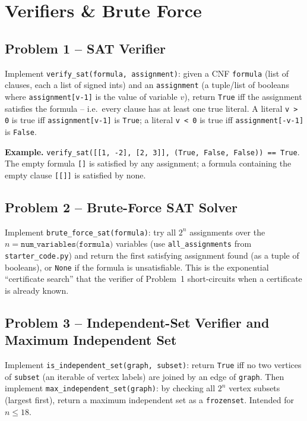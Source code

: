 \documentclass[11pt]{article}
\begin{document}
\newpage
\section{Verifiers \& Brute Force}

\subsection*{Problem 1 -- SAT Verifier}

Implement \texttt{verify\_sat(formula, assignment)}: given a CNF \texttt{formula} (list of
clauses, each a list of signed ints) and an \texttt{assignment} (a tuple/list of booleans
where \texttt{assignment[v-1]} is the value of variable $v$), return \texttt{True} iff the
assignment satisfies the formula -- i.e.\ every clause has at least one true literal. A
literal \texttt{v > 0} is true iff \texttt{assignment[v-1]} is \texttt{True}; a literal
\texttt{v < 0} is true iff \texttt{assignment[-v-1]} is \texttt{False}.

\textbf{Example.} \texttt{verify\_sat([[1, -2], [2, 3]], (True, False, False)) == True}.
The empty formula \texttt{[]} is satisfied by any assignment; a formula containing the
empty clause \texttt{[[]]} is satisfied by none.

\subsection*{Problem 2 -- Brute-Force SAT Solver}

Implement \texttt{brute\_force\_sat(formula)}: try all $2^n$ assignments over the $n =
\texttt{num\_variables(formula)}$ variables (use \texttt{all\_assignments} from
\texttt{starter\_code.py}) and return the first satisfying assignment found (as a tuple of
booleans), or \texttt{None} if the formula is unsatisfiable. This is the exponential
``certificate search'' that the verifier of Problem~1 short-circuits when a certificate is
already known.

\subsection*{Problem 3 -- Independent-Set Verifier and Maximum Independent Set}

Implement \texttt{is\_independent\_set(graph, subset)}: return \texttt{True} iff no two
vertices of \texttt{subset} (an iterable of vertex labels) are joined by an edge of
\texttt{graph}. Then implement \texttt{max\_independent\_set(graph)}: by checking all $2^n$
vertex subsets (largest first), return a maximum independent set as a \texttt{frozenset}.
Intended for $n \le 18$.
\end{document}
